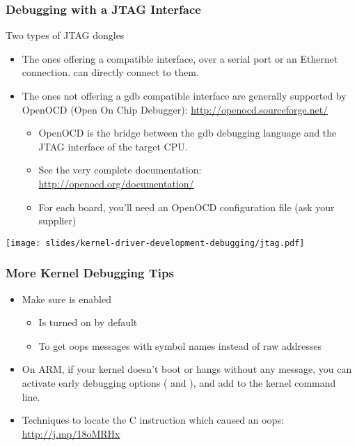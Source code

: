 \begin{frame}
  \frametitle{Debugging with a JTAG Interface}
  Two types of JTAG dongles
  \begin{itemize}
  \item The ones offering a  compatible interface, over a
    serial port or an Ethernet connection.  can directly
    connect to them.
  \item The ones not offering a gdb compatible interface are generally
    supported by OpenOCD (Open On Chip Debugger):
    \url{http://openocd.sourceforge.net/}
    \begin{itemize}
    \item OpenOCD is the bridge between the gdb debugging language
      and the JTAG interface of the target CPU.
    \item See the very complete documentation:
      \url{http://openocd.org/documentation/}
    \item For each board, you'll need an OpenOCD configuration file
      (ask your supplier)
    \end{itemize}
  \end{itemize}
   \begin{center}
     \texttt{[image: slides/kernel-driver-development-debugging/jtag.pdf]}
   \end{center}
\end{frame}

\begin{frame}
  \frametitle{More Kernel Debugging Tips}
  \begin{itemize}
  \item Make sure  is enabled
    \begin{itemize}
    \item Is turned on by default
    \item To get oops messages with symbol names instead of raw addresses
    \end{itemize}
  \item On ARM, if your kernel doesn't boot or hangs without any
    message, you can activate early debugging options
    ( and ), and add
     to the kernel command line.
  \item Techniques to locate the C instruction which caused an oops:
    \url{http://j.mp/18oMRHx}
  \end{itemize}
\end{frame}
